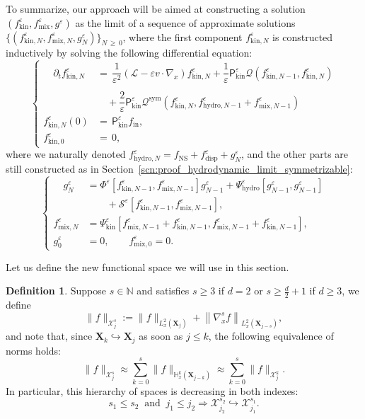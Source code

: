 \documentclass[10pt]{amsart}
\theoremstyle{definition}\newtheorem{defi}[theo]{Definition}\newtheorem{rema}[theo]{Remark}\newtheorem{exam}[theo]{Example}\newtheorem{exem}[theo]{Example}\newtheorem{nota}[theo]{Notation}
\newcommand{\ini}{\mathrm{in}}
\newcommand{\ns}{\mathrm{NS}}
\newcommand{\hyd}{\mathrm{hydro}}
\newcommand{\mix}{\mathrm{mix}}
\newcommand{\kin}{\mathrm{kin}}
\newcommand{\sym}{\mathrm{sym}}
\newcommand{\disp}{\mathrm{disp}}
\newcommand{\N}{\mathbb{N}}
\newcommand{\bbH}{\mathbb{H}}
\newcommand{\XX}{\mathcal{X}}
\newcommand{\LL}{\mathcal{L}}
\newcommand{\PP}{\mathsf{P}}
\newcommand{\QQ}{\mathcal{Q}}
\renewcommand{\SS}{\mathcal{S}}
\newcommand{\Sh}{\bm{X}}
\newcommand{\SSh}{\bm{\XX}}
\renewcommand*\le{\leqslant}
\renewcommand*\ge{\geqslant}
\renewcommand*\leq{\leqslant}
\renewcommand*\geq{\geqslant}
\newcommand*\eps{{\varepsilon}}
\begin{document}
To summarize, our approach will be aimed at constructing a solution $(f^\eps_\kin, f^\eps_\mix, g^\eps)$ as the limit of a sequence of approximate solutions $\{(f^\eps_{\kin, N}, f^\eps_{\mix, N}, g^\eps_N)\}_{N\,\geq\,0}$, where the first component $f_{\kin,N}^\eps$ is constructed inductively by solving the following differential equation:
\begin{equation}\label{eq:scheme}
\begin{cases}
\displaystyle
\quad\partial_t f^\eps_{\kin, N} &=\, \dfrac{1}{\eps^2} \left(\LL - \eps v \cdot \nabla_x\right) f^\eps_{\kin, N} + \dfrac{1}{\eps} \PP^\eps_\kin \QQ\left(f^\eps_{\kin, N-1}, f^\eps_{\kin, N}\right) \\  \\
&\quad  + \dfrac{2}{\eps} \PP^\eps_\kin \QQ^\sym\left(f^\eps_{\kin, N}, f^\eps_{\hyd, N-1} + f^\eps_{\mix, N-1}\right)\\
f^\eps_{\kin, N}(0) &= \,\PP^\eps_\kin f_\ini,\\
f^\eps_{\kin, 0} &=\, 0,
\end{cases}
\end{equation}
where we naturally denoted $f^\eps_{\hyd, N} = f_\ns + f^\eps_\disp + g^\eps_N$, and the other parts are still constructed as in Section~\ref{scn:proof_hydrodynamic_limit_symmetrizable}:
\begin{equation*}
\begin{cases}
\quad g^\eps_N &= \Phi^\eps\left[f^\eps_{\kin, N-1}, f^\eps_{\mix, N-1}\right] g^\eps_{N-1} + \Psi^\eps_\hyd\left[g^\eps_{N-1}, g^\eps_{N-1}\right] \\
&\qquad + \SS^\eps\left[f^\eps_{\kin, N-1}, f^\eps_{\mix, N-1}\right], \\
f^\eps_{\mix, N} &= \Psi^\eps_\kin\left[f^\eps_{\mix,N-1} + f^\eps_{\kin, N-1}, f^\eps_{\mix,N-1} + f^\eps_{\kin, N-1} \right], \\
g^\eps_0 &= 0, \qquad f^\eps_{\mix,0} = 0.
\end{cases}
\end{equation*}

Let us define the new functional space we will use in this section.
\begin{defi}
Suppose $s \in \N$ and satisfies $s \ge 3$ if $d = 2$ or $s \ge \frac{d}{2} + 1$ if $d \ge 3$, we define
\begin{equation*}
\| f \|_{ \SSh_j^s } := \| f \|_{ L^2_x \left(\Sh_j \right) } + \left\| \nabla_x^s f \right\|_{ L^2_x \left(\Sh_{j-s} \right) },
\end{equation*}
and note that, since $\Sh_k \hookrightarrow \Sh_j$ as soon as $j \leq k$, the following equivalence of norms holds:
\begin{equation*}
\| f \|_{ \SSh_j^s } \approx \sum_{k = 0}^{s} \| f \|_{ \bbH^k_x \left(\Sh_{j-k} \right) } \approx \sum_{k = 0}^{s} \| f \|_{ \SSh_j^k }.
\end{equation*}
In particular, this hierarchy of spaces is decreasing in both indexes:
\begin{equation}\label{eq:hierarchy_degenerate_spaces}
s_1 \le s_2~\text{ and }~j_1 \le j_2 \Longrightarrow \SSh_{j_2}^{s_2} \hookrightarrow \SSh_{j_1}^{s_1}.
\end{equation}
\end{defi}
\end{document}

